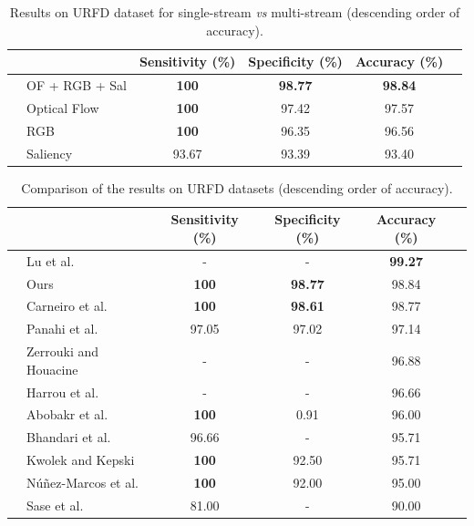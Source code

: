 \documentclass[conference]{IEEEtran}
\begin{document}
\begin{table}[]
\centering
\caption{Results on URFD dataset for single-stream \textit{vs} multi-stream (descending order of accuracy).}
\label{tab:urfd-ensem}
\begin{tabular}{llcccl}
\hline
 &  & Sensitivity (\%) & Specificity (\%) & Accuracy (\%) &  \\ \hline
 & OF + RGB + Sal & \textbf{100} & \textbf{98.77} & \textbf{98.84} &  \\
 & Optical Flow & \textbf{100} & 97.42 & 97.57 &  \\
 & RGB & \textbf{100} & 96.35 & 96.56 &  \\
 & Saliency & 93.67 & 93.39 & 93.40 &  \\ \hline
\end{tabular}
\end{table}
\begin{table}[]
\centering
\caption{Comparison of the results on URFD datasets (descending order of accuracy).}
\label{tab:urfd-our-their}
\begin{tabular}{llcccl}
\hline
 &                                                      & Sensitivity (\%)  & Specificity (\%)  & Accuracy (\%)     & \\ \hline
 & Lu et al.~\cite{lu2018deep}                          & -                 & -                 & \textbf{99.27}    & \\
 & Ours                                                 & \textbf{100}      & \textbf{98.77}    & 98.84             & \\
 & Carneiro et al.~\cite{carneiro2019multi}                                                 & \textbf{100}      & \textbf{98.61}    & 98.77             & \\
 & Panahi et al.~\cite{panahi2018human}                 & 97.05             & 97.02             & 97.14             & \\
 & Zerrouki and Houacine~\cite{zerrouki2018combined}    & -                 & -                 & 96.88             & \\
 & Harrou et al.~\cite{harrou2017vision}                & -                 & -                 & 96.66             & \\
 & Abobakr et al.~\cite{abobakr2017skeleton}            & \textbf{100}      & 0.91              & 96.00             & \\
 & Bhandari et al.~\cite{bhandari2017novel}             & 96.66             & -                 & 95.71             & \\
 & Kwolek and Kepski~\cite{kwolek2015improving}         & \textbf{100}      & 92.50             & 95.71             & \\
 & N\'u\~nez-Marcos et al.~\cite{nunez2017vision}       & \textbf{100}      & 92.00             & 95.00             & \\
 & Sase et al.~\cite{sase2018human}                     & 81.00             & -                 & 90.00             & \\ \hline
\end{tabular}
\end{table}
\end{document}
